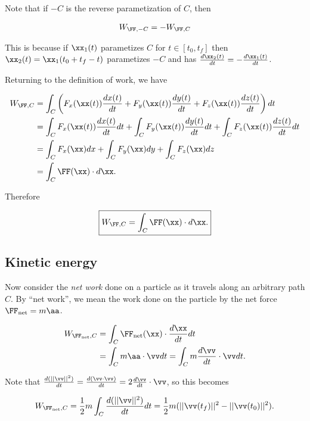 \documentclass{article}
\begin{document}
Note that if $-C$ is the reverse parametization of $C$, then

\begin{align*}
    W_{\FF, -C} = -W_{\FF, C}
\end{align*}

This is because if $\xx_1(t)$ parametizes $C$ for $t \in [t_0, t_f]$ then $\xx_2(t) = \xx_1(t_0 + t_f - t)$ parametizes $-C$ and has $\frac{d\xx_2(t)}{dt} = - \frac{d\xx_1(t)}{dt}$.

Returning to the definition of work, we have

\begin{align*}
    W_{\FF, C} &= \int_C \left( F_x(\xx(t)) \frac{dx(t)}{dt} + F_y(\xx(t)) \frac{dy(t)}{d t} + F_z(\xx(t)) \frac{d z(t)}{dt} \right) dt \\
    &= \int_C F_x(\xx(t)) \frac{d x(t)}{d t} d t + \int_C F_y(\xx(t)) \frac{d y(t)}{d t} d t + \int_C F_z(\xx(t)) \frac{d z(t)}{d t} d t \\
    &= \int_C F_x(\xx) d x + \int_C F_y(\xx) d y + \int_C F_z(\xx) dz \\
    &= \int_C \FF(\xx) \cdot d \xx.
\end{align*}

Therefore 

\begin{align*}
    \boxed
    {
        W_{\FF, C} = \int_C \FF(\xx) \cdot d \xx.
    }
\end{align*}

\subsection*{Kinetic energy}

Now consider the \textit{net work} done on a particle as it travels along an arbitrary path $C$. By ``net work'', we mean the work done on the particle by the net force $\FF_{\text{net}} = m \aa$.

\begin{align*}
    W_{\FF_{\text{net}}, C} &= \int_C \FF_{\text{net}}(\xx) \cdot \frac{d \xx}{d t} d t \\
    &= \int_C m \aa \cdot \vv d t = \int_C m \frac{d \vv}{d t} \cdot \vv d t.
\end{align*}

Note that $\frac{d(||\vv||^2)}{dt} = \frac{d(\vv \cdot \vv)}{dt} = 2 \frac{d\vv}{dt} \cdot \vv$, so this becomes

\begin{align*}
    W_{\FF_{\text{net}}, C} = \frac{1}{2} m \int_C \frac{d(||\vv||^2)}{dt} dt = \frac{1}{2} m (||\vv(t_f)||^2 - ||\vv(t_0)||^2).
\end{align*}
\end{document}
